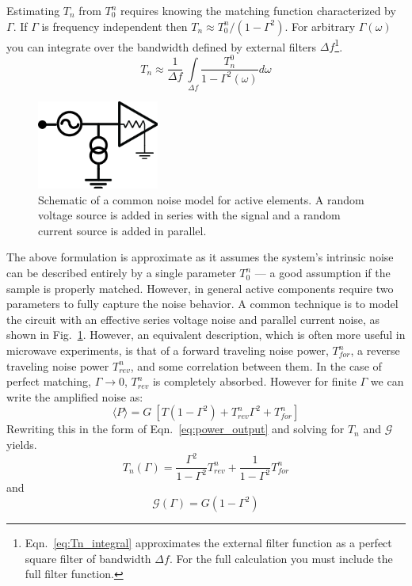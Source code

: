 Estimating $T_n$ from $T_0^n$ requires knowing the matching function characterized by $\Gamma$. If $\Gamma$ is frequency independent then $T_n \approx T_0^n / (1-\Gamma^2)$. For arbitrary $\Gamma(\omega)$ you can integrate over the bandwidth defined by external filters $\Delta f$\footnote{Eqn.~\ref{eq:Tn_integral} approximates the external filter function as a perfect square filter of bandwidth $\Delta f$. For the full calculation you must include the full filter function.}.
\begin{equation}\label{eq:Tn_integral}
T_n \approx \frac{1}{\Delta f}\ \int\limits_{\Delta f}\frac{T_n^0}{1-\Gamma^2(\omega)}d\omega
\end{equation}
\begin{figure}
\centering
\includegraphics[width=40mm]{figures/Johnson_noise_thermometry/schematic_noise_IV.png}
\caption{Schematic of a common noise model for active elements. A random voltage source is added in series with the signal and a random current source is added in parallel.}
\label{fig:schematic_noise_IV}
\end{figure}

The above formulation is approximate as it assumes the system's intrinsic noise can be described entirely by a single parameter $T_0^n$ --- a good assumption if the sample is properly matched. However, in general active components require two parameters to fully capture the noise behavior. A common technique is to model the circuit with an effective series voltage noise and parallel current noise, as shown in Fig.~\ref{fig:schematic_noise_IV}. However, an equivalent description, which is often more useful in microwave experiments, is that of a forward traveling noise power, $T_{for}^n$, a reverse traveling noise power $T_{rev}^n$, and some correlation between them. In the case of perfect matching, $\Gamma\rightarrow0$, $T_{rev}^n$ is completely absorbed. However for finite $\Gamma$ we can write the amplified noise as:
\begin{equation}\label{eq:P_full}
\langle P\rangle=G\ \left[T(1-\Gamma^2)+T_{rev}^n\Gamma^2+T_{for}^n\right]
\end{equation}
Rewriting this in the form of Eqn.~\ref{eq:power_output} and solving for $T_n$ and $\mathcal{G}$ yields.
\begin{equation}\label{eq:Tn_effective_full}
T_n(\Gamma)=\frac{\Gamma^2}{1-\Gamma^2}T_{rev}^n+\frac{1}{1-\Gamma^2}T_{for}^n
\end{equation}
and
\begin{equation}\label{eq:G_effective_full}
\mathcal{G}(\Gamma)=G(1-\Gamma^2)
\end{equation}

